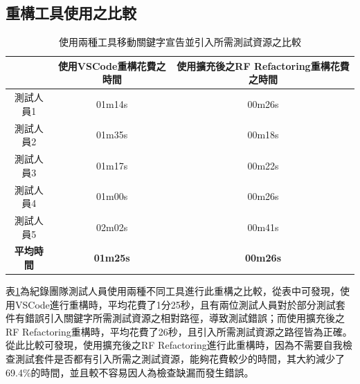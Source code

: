 \subsection{重構工具使用之比較}

\begin{table}[H]
    \begin{center}
    \caption{使用兩種工具移動關鍵字宣告並引入所需測試資源之比較}\label{t5.2}
        \begin{tabular}{|c|c|c|}\hline
                & 使用VSCode重構花費之時間 & 使用擴充後之RF Refactoring重構花費之時間    \\\hline
        測試人員1      & 01m14s             & 00m26s    \\\hline
        測試人員2      & 01m35s             & 00m18s    \\\hline
        測試人員3      & 01m17s             & 00m22s    \\\hline
        測試人員4      & 01m00s             & 00m26s    \\\hline
        測試人員5      & 02m02s             & 00m41s    \\\hline
\textbf{平均時間}      & \textbf{01m25s}    & \textbf{00m26s}    \\\hline
        \end{tabular}
    \end{center}
\end{table}
\indent
表\ref{t5.2}為紀錄團隊測試人員使用兩種不同工具進行此重構之比較，從表中可發現，使用VSCode進行重構時，平均花費了1分25秒，且有兩位測試人員對於部分測試套件有錯誤引入關鍵字所需測試資源之相對路徑，導致測試錯誤；而使用擴充後之RF Refactoring重構時，平均花費了26秒，且引入所需測試資源之路徑皆為正確。從此比較可發現，使用擴充後之RF Refactoring進行此重構時，因為不需要自我檢查測試套件是否都有引入所需之測試資源，能夠花費較少的時間，其大約減少了69.4\%的時間，並且較不容易因人為檢查缺漏而發生錯誤。